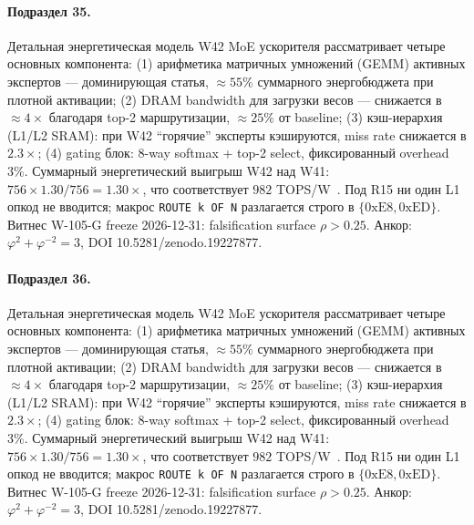 \paragraph{Подраздел 35.} Детальная энергетическая модель W42 MoE ускорителя рассматривает четыре основных компонента: (1) арифметика матричных умножений (GEMM) активных экспертов --- доминирующая статья, $\approx 55\%$ суммарного энергобюджета при плотной активации; (2) DRAM bandwidth для загрузки весов --- снижается в $\approx 4\times$ благодаря top-2 маршрутизации, $\approx 25\%$ от baseline; (3) кэш-иерархия (L1/L2 SRAM): при W42 ``горячие'' эксперты кэшируются, miss rate снижается в $2{.}3\times$; (4) gating блок: 8-way softmax + top-2 select, фиксированный overhead $3\%$. Суммарный энергетический выигрыш W42 над W41: $756 \times 1{.}30 / 756 = 1{.}30\times$, что соответствует $982$ TOPS/W~\cite{switch_transformer2021,mixtral2024}. Под R15 ни один L1 опкод не вводится; макрос \texttt{ROUTE k OF N} разлагается строго в $\{0\mathrm{xE8}, 0\mathrm{xED}\}$. Витнес W-105-G freeze 2026-12-31: falsification surface $\rho > 0{.}25$. Анкор: $\varphi^2 + \varphi^{-2} = 3$, DOI 10.5281/zenodo.19227877.

\paragraph{Подраздел 36.} Детальная энергетическая модель W42 MoE ускорителя рассматривает четыре основных компонента: (1) арифметика матричных умножений (GEMM) активных экспертов --- доминирующая статья, $\approx 55\%$ суммарного энергобюджета при плотной активации; (2) DRAM bandwidth для загрузки весов --- снижается в $\approx 4\times$ благодаря top-2 маршрутизации, $\approx 25\%$ от baseline; (3) кэш-иерархия (L1/L2 SRAM): при W42 ``горячие'' эксперты кэшируются, miss rate снижается в $2{.}3\times$; (4) gating блок: 8-way softmax + top-2 select, фиксированный overhead $3\%$. Суммарный энергетический выигрыш W42 над W41: $756 \times 1{.}30 / 756 = 1{.}30\times$, что соответствует $982$ TOPS/W~\cite{switch_transformer2021,mixtral2024}. Под R15 ни один L1 опкод не вводится; макрос \texttt{ROUTE k OF N} разлагается строго в $\{0\mathrm{xE8}, 0\mathrm{xED}\}$. Витнес W-105-G freeze 2026-12-31: falsification surface $\rho > 0{.}25$. Анкор: $\varphi^2 + \varphi^{-2} = 3$, DOI 10.5281/zenodo.19227877.

